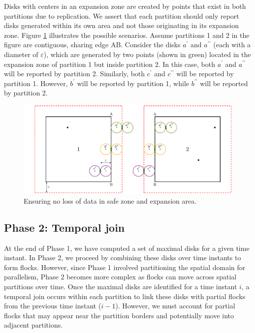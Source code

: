 Disks with centers in an expansion zone are created by points that exist in both partitions due to replication. We assert that each partition should only report 
disks generated within its own area and not those originating in its expansion zone. Figure \ref{fig:ensuring} illustrates the possible scenarios. Assume 
partitions 1 and 2 in the figure are contiguous, sharing edge AB. Consider the disks $a^\prime$ and $a^{\prime\prime}$ (each with a diameter of $\varepsilon$), 
which are generated by two points (shown in green) located in the expansion zone of partition 1 but inside partition 2. In this case, both $a^\prime$ and 
$a^{\prime\prime}$ will be reported by partition 2. Similarly, both $c^\prime$ and $c^{\prime\prime}$ will be reported by partition 1. However, $b^\prime$ will 
be reported by partition 1, while $b^{\prime\prime}$ will be reported by partition 2.

\begin{figure}
    \centering
    \includegraphics[width=\linewidth]{chapterPFlocks/figures/merge.pdf}
    \caption{Ensuring no loss of data in safe zone and expansion area.}\label{fig:ensuring}
\end{figure}

\subsection{Phase 2: Temporal join}\label{sec:temporal_join}
At the end of Phase 1, we have computed a set of maximal disks for a given time instant. In Phase 2, we proceed by combining these disks over time instants to 
form flocks. However, since Phase 1 involved partitioning the spatial domain for parallelism, Phase 2 becomes more complex as flocks can move across spatial 
partitions over time. Once the maximal disks are identified for a time instant $i$, a temporal join occurs within each partition to link these disks with 
partial flocks from the previous time instant ($i-1$). However, we must account for partial flocks that may appear near the partition borders and potentially 
move into adjacent partitions.

